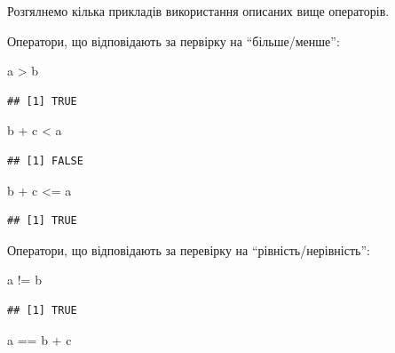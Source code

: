 \documentclass[
]{book}
\newenvironment{Shaded}{\begin{snugshade}}{\end{snugshade}}
\newcommand{\NormalTok}[1]{#1}
\newcommand{\SpecialCharTok}[1]{\textcolor[rgb]{0.00,0.00,0.00}{#1}}
\begin{document}
Розгялнемо кілька прикладів використання описаних вище операторів.

Оператори, що відповідають за первірку на ``більше/менше'':

\begin{Shaded}
\begin{Highlighting}[]
\NormalTok{a }\SpecialCharTok{\textgreater{}}\NormalTok{ b}
\end{Highlighting}
\end{Shaded}

\begin{verbatim}
## [1] TRUE
\end{verbatim}

\begin{Shaded}
\begin{Highlighting}[]
\NormalTok{b }\SpecialCharTok{+}\NormalTok{ c }\SpecialCharTok{\textless{}}\NormalTok{ a}
\end{Highlighting}
\end{Shaded}

\begin{verbatim}
## [1] FALSE
\end{verbatim}

\begin{Shaded}
\begin{Highlighting}[]
\NormalTok{b }\SpecialCharTok{+}\NormalTok{ c }\SpecialCharTok{\textless{}=}\NormalTok{ a}
\end{Highlighting}
\end{Shaded}

\begin{verbatim}
## [1] TRUE
\end{verbatim}

Оператори, що відповідають за перевірку на ``рівність/нерівність'':

\begin{Shaded}
\begin{Highlighting}[]
\NormalTok{a }\SpecialCharTok{!=}\NormalTok{ b}
\end{Highlighting}
\end{Shaded}

\begin{verbatim}
## [1] TRUE
\end{verbatim}

\begin{Shaded}
\begin{Highlighting}[]
\NormalTok{a }\SpecialCharTok{==}\NormalTok{ b }\SpecialCharTok{+}\NormalTok{ c}
\end{Highlighting}
\end{Shaded}
\end{document}
